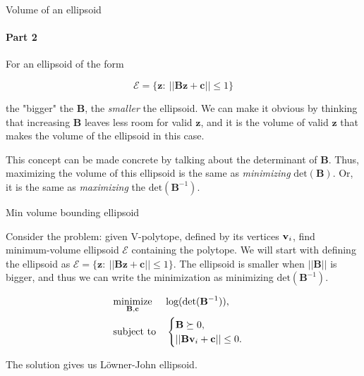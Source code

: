 \documentclass{beamer}
\begin{document}
\begin{frame}{Volume of an ellipsoid}
\framesubtitle{Part 2}
\begin{flushleft}

For an ellipsoid of the form

\begin{equation}
    \mathcal{E} = \{ \mathbf{z}: \ || \mathbf{B}\mathbf{z} + \mathbf{c} || \leq 1 \}
\end{equation}

the "bigger" the $\mathbf{B}$, the \emph{smaller} the ellipsoid. We can make it obvious by thinking that increasing $\mathbf{B}$ leaves less room for valid $\mathbf{z}$, and it is the volume of valid $\mathbf{z}$ that makes the volume of the ellipsoid in this case.

\bigskip

This concept can be made concrete by talking about the determinant of $\mathbf{B}$. Thus, maximizing the volume of this ellipsoid is the same as \emph{minimizing} $\text{det}(\mathbf{B})$. Or, it is the same as \emph{maximizing} the $\text{det}(\mathbf{B}^{-1})$.
 
\end{flushleft}
\end{frame}


\begin{frame}{Min volume bounding ellipsoid}
	\begin{flushleft}
		
		Consider the problem: given V-polytope, defined by its vertices $\mathbf{v}_i$, find minimum-volume ellipsoid $\mathcal{E}$ containing the polytope. We will start with defining the ellipsoid as $\mathcal{E} = \{ \mathbf{z}: \ || \mathbf{B}\mathbf{z} + \mathbf{c} || \leq 1 \}$. The ellipsoid is smaller when $|| \mathbf{B} ||$ is bigger, and thus we can write the minimization as minimizing $\text{det} (\mathbf{B}^{-1}) $.
		
\begin{equation}
	\begin{aligned}
		& \underset{\mathbf{B}, \mathbf{c}}{\text{minimize}}
		& & \text{log} (\text{det} (\mathbf{B}^{-1}) ), \\
		& \text{subject to}
		& & \begin{cases}
			\mathbf{B} \succeq 0, \\
			|| \mathbf{B} \mathbf{v}_i + \mathbf{c} || \leq 0.
		\end{cases}
	\end{aligned}
\end{equation}

The solution gives us L\"owner-John ellipsoid.
		
	\end{flushleft}
\end{frame}
\end{document}
